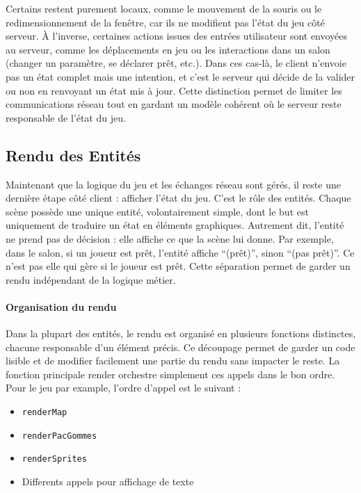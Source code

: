 \documentclass[a4paper, 11pt]{article}
\begin{document}
Certains restent purement locaux, comme le mouvement de la souris ou le redimensionnement de la fenêtre, car ils ne modifient pas l’état du jeu côté serveur.
À l’inverse, certaines actions issues des entrées utilisateur sont envoyées au serveur, comme les déplacements en jeu ou les interactions dans un salon (changer un paramètre, se déclarer prêt, etc.).
Dans ces cas-là, le client n’envoie pas un état complet mais une intention, et c’est le serveur qui décide de la valider ou non en renvoyant un état mis à jour.
Cette distinction permet de limiter les communications réseau tout en gardant un modèle cohérent où le serveur reste responsable de l’état du jeu.


\subsection{Rendu des Entités}

Maintenant que la logique du jeu et les échanges réseau sont gérés, il reste une dernière étape côté client : afficher l’état du jeu.
C’est le rôle des entités.
Chaque scène possède une unique entité, volontairement simple, dont le but est uniquement de traduire un état en éléments graphiques.
Autrement dit, l’entité ne prend pas de décision : elle affiche ce que la scène lui donne.
Par exemple, dans le salon, si un joueur est prêt, l’entité affiche “(prêt)”, sinon “(pas prêt)”. Ce n'est pas elle qui gère si le joueur est prêt.
Cette séparation permet de garder un rendu indépendant de la logique métier.

\paragraph{Organisation du rendu}
Dans la plupart des entités, le rendu est organisé en plusieurs fonctions distinctes, chacune responsable d’un élément précis.
Ce découpage permet de garder un code lisible et de modifier facilement une partie du rendu sans impacter le reste.
La fonction principale render orchestre simplement ces appels dans le bon ordre. Pour le jeu par example, l'ordre d'appel est le suivant :

\begin{itemize}
    \item \texttt{renderMap}
    \item \texttt{renderPacGommes}
    \item \texttt{renderSprites}
    \item Differents appels pour affichage de texte
\end{itemize}
\end{document}
